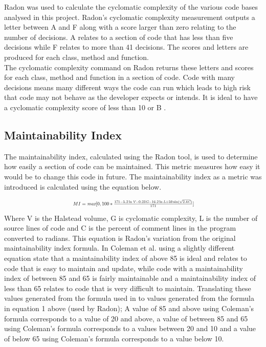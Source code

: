 \documentclass[10.5pt,journal, a4paper]{IEEEtran}
\begin{document}
\noindent
Radon was used to calculate the cyclomatic complexity of the various code bases analysed in this project. Radon's cyclomatic complexity measurement outputs a letter between A and F along with a score larger than zero relating to the number of decisions. A relates to a section of code that has less than five decisions while F relates to more than 41 decisions. The scores and letters are produced for each class, method and function.\\

\noindent
The cyclomatic complexity command on Radon returns these letters and scores for each class, method and function in a section of code. Code with many decisions means many different ways the code can run which leads to high risk that code may not behave as the developer expects or intends. It is ideal to have a cyclomatic complexity score of less than 10 or B \cite{mcCabe}.  


\subsection{Maintainability Index}
\noindent
The maintainability index, calculated using the Radon tool, is used to determine how easily a section of code can be maintained. This metric measures how easy it would be to change this code in future. The maintainability index as a metric was introduced is calculated using the equation below. 


\begin{equation}
\resizebox{0.5\textwidth}{!}{ $MI = \emph{max} [0,100*\frac{171-5.2\ln\emph{V}-0.23\emph{G} -16.2\ln\emph{L} + 50\sin(\sqrt{2.4\emph{C}}) }{171}]$}
\end{equation}
Where V is the Halstead volume, G is cyclomatic complexity, L is the number of source lines of code and C is the percent of comment lines in the program converted to radians. This equation is Radon's variation from the original maintainability index formula. In \cite{MI1} Coleman et al. using a slightly different equation state that a maintainability index of above 85 is ideal and relates to code that is easy to maintain and update, while code with a maintainability index of between 85 and 65 is fairly maintainable and a maintainability index of less than 65 relates to code that is very difficult to maintain. Translating these values generated from the formula used in \cite{MI1} to values generated from the formula in equation 1 above (used by Radon); A value of 85 and above using Coleman's formula corresponds to a value of 20 and above, a value of between 85 and 65 using Coleman's formula corresponds to a values between 20 and 10 and a value of below 65 using Coleman's formula corresponds to a value below 10. \\
\end{document}
